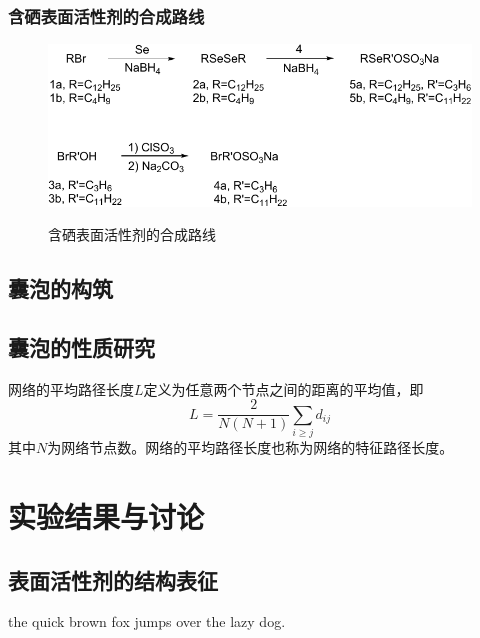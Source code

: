 \documentclass[bachelor,fandolfonts,replaceperiod]{jnuthesis} %
\begin{document}
    \subsection{含硒表面活性剂的合成路线}
    \begin{figure}[htbp]
        \centering
        \includegraphics[]{Figure/synthesis.pdf}\\
        \caption{含硒表面活性剂的合成路线}\label{fig:synthesis}
    \end{figure}
    
    \zhlipsum[1]
    
    \section{囊泡的构筑}
    \zhlipsum[1]
    
    \section{囊泡的性质研究}
    
    \begin{definition}[平均路径长度]
        网络的平均路径长度$L$定义为任意两个节点之间的距离的平均值，即
        \begin{equation}\label{eq:avarage_path_lentgh}
        L = \frac{2}{N(N+1)}\sum_{i\geq j}d_{ij}
        \end{equation}
        其中$N$为网络节点数。网络的平均路径长度也称为网络的特征路径长度。
    \end{definition}
    
    \chapter{实验结果与讨论}\label{chapter:results}
    \section{表面活性剂的结构表征}
    the quick brown fox jumps over the lazy dog.
        
\end{document}
